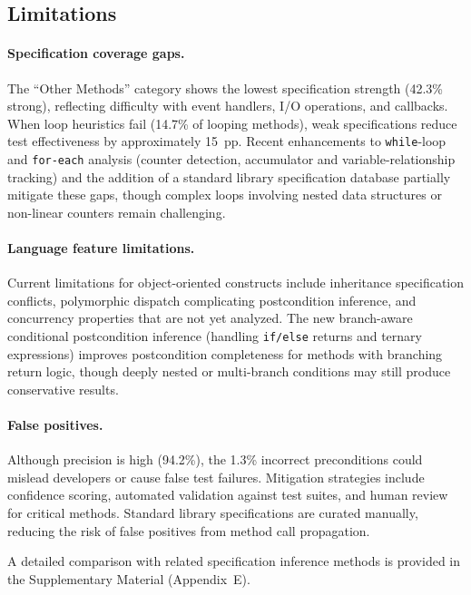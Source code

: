 \subsection{Limitations}

\paragraph{Specification coverage gaps.} The ``Other Methods'' category shows the lowest specification strength (42.3\% strong), reflecting difficulty with event handlers, I/O operations, and callbacks. When loop heuristics fail (14.7\% of looping methods), weak specifications reduce test effectiveness by approximately 15~pp. Recent enhancements to \texttt{while}-loop and \texttt{for-each} analysis (counter detection, accumulator and variable-relationship tracking) and the addition of a standard library specification database partially mitigate these gaps, though complex loops involving nested data structures or non-linear counters remain challenging.

\paragraph{Language feature limitations.} Current limitations for object-oriented constructs include inheritance specification conflicts, polymorphic dispatch complicating postcondition inference, and concurrency properties that are not yet analyzed. The new branch-aware conditional postcondition inference (handling \texttt{if/else} returns and ternary expressions) improves postcondition completeness for methods with branching return logic, though deeply nested or multi-branch conditions may still produce conservative results.

\paragraph{False positives.} Although precision is high (94.2\%), the 1.3\% incorrect preconditions could mislead developers or cause false test failures. Mitigation strategies include confidence scoring, automated validation against test suites, and human review for critical methods. Standard library specifications are curated manually, reducing the risk of false positives from method call propagation.

A detailed comparison with related specification inference methods is provided in the Supplementary Material (Appendix~E).
